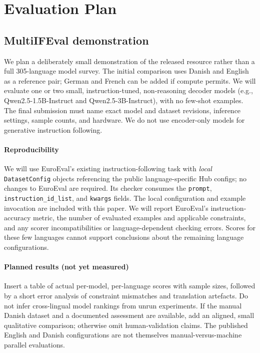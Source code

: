 \documentclass[11pt]{article}
\begin{document}
\section{Evaluation Plan}
\label{sec:evaluation}

\subsection{MultiIFEval demonstration}

We plan a deliberately small demonstration of the released resource rather than a
full 305-language model survey. The initial comparison uses Danish and English
as a reference pair; German and French can be added if compute permits. We
will evaluate one or two small, instruction-tuned, non-reasoning decoder models
(e.g., Qwen2.5-1.5B-Instruct and Qwen2.5-3B-Instruct), with no few-shot examples.
The final submission must name exact model and dataset revisions, inference
settings, sample counts, and hardware. We do not use encoder-only models for
generative instruction following.

\paragraph{Reproducibility}
We will use EuroEval's existing instruction-following task with \emph{local}
\texttt{DatasetConfig} objects referencing the public language-specific Hub
configs; no changes to EuroEval are required. Its checker consumes the
\texttt{prompt}, \texttt{instruction\_id\_list}, and \texttt{kwargs} fields.
The local configuration and example invocation are included with this paper.
We will report EuroEval's instruction-accuracy metric, the number of evaluated
examples and applicable constraints, and any scorer incompatibilities or
language-dependent checking errors. Scores for these few languages cannot
support conclusions about the remaining language configurations.

\paragraph{Planned results (not yet measured)}
Insert a table of actual per-model, per-language scores with sample sizes,
followed by a short error analysis of constraint mismatches and translation
artefacts. Do not infer cross-lingual model rankings from unrun experiments.
If the manual Danish dataset and a documented assessment are available, add
an aligned, small qualitative comparison; otherwise omit human-validation
claims. The published English and Danish configurations are not themselves
manual-versus-machine parallel evaluations.
\end{document}
